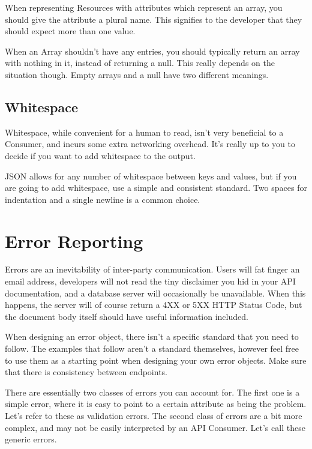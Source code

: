 \documentclass{book}
\begin{document}
When representing Resources with attributes which represent an array, you should give the attribute a plural name. This signifies to the developer that they should expect more than one value.

When an Array shouldn't have any entries, you should typically return an array with nothing in it, instead of returning a null. This really depends on the situation though. Empty arrays and a null have two different meanings.

\subsection{Whitespace}

Whitespace, while convenient for a human to read, isn't very beneficial to a Consumer, and incurs some extra networking overhead. It's really up to you to decide if you want to add whitespace to the output.

JSON allows for any number of whitespace between keys and values, but if you are going to add whitespace, use a simple and consistent standard. Two spaces for indentation and a single newline is a common choice.

\section{Error Reporting}

Errors are an inevitability of inter-party communication. Users will fat finger an email address, developers will not read the tiny disclaimer you hid in your API documentation, and a database server will occasionally be unavailable. When this happens, the server will of course return a 4XX or 5XX HTTP Status Code, but the document body itself should have useful information included.

When designing an error object, there isn't a specific standard that you need to follow. The examples that follow aren't a standard themselves, however feel free to use them as a starting point when designing your own error objects. Make sure that there is consistency between endpoints.

There are essentially two classes of errors you can account for. The first one is a simple error, where it is easy to point to a certain attribute as being the problem. Let's refer to these as validation errors. The second class of errors are a bit more complex, and may not be easily interpreted by an API Consumer. Let's call these generic errors.
\end{document}
